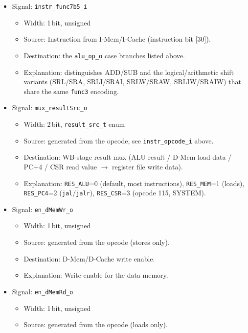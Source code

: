 \begin{itemize}
\begin{itemize}
      \texttt{BR\_GE} (\texttt{bge}); 110 $\to$ \texttt{BR\_LTU}
      (\texttt{bltu}); 111 $\to$ \texttt{BR\_GEU} (\texttt{bgeu}); 010/011
      $\to$ \texttt{trap\_illegal\_instr\_o}=1 (reserved encodings).
  \end{itemize}
  \item Signal: \texttt{instr\_func7b5\_i}
  \begin{itemize}
    \item Width: 1\,bit, unsigned
    \item Source: Instruction from I-Mem/I-Cache (instruction bit [30]).
    \item Destination: the \texttt{alu\_op\_o} case branches listed above.
    \item Explanation: distinguishes ADD/SUB and the logical/arithmetic
      shift variants (SRL/SRA, SRLI/SRAI, SRLW/SRAW, SRLIW/SRAIW) that
      share the same \texttt{func3} encoding.
  \end{itemize}
  \item Signal: \texttt{mux\_resultSrc\_o}
  \begin{itemize}
    \item Width: 2\,bit, \texttt{result\_src\_t} enum
    \item Source: generated from the opcode, see \texttt{instr\_opcode\_i} above.
    \item Destination: WB-stage result mux (ALU result / D-Mem load data /
      PC+4 / CSR read value $\to$ register file write data).
    \item Explanation: \texttt{RES\_ALU}=0 (default, most instructions),
      \texttt{RES\_MEM}=1 (loads), \texttt{RES\_PC4}=2 (\texttt{jal}/\texttt{jalr}),
      \texttt{RES\_CSR}=3 (opcode 115, SYSTEM).
  \end{itemize}
  \item Signal: \texttt{en\_dMemWr\_o}
  \begin{itemize}
    \item Width: 1\,bit, unsigned
    \item Source: generated from the opcode (stores only).
    \item Destination: D-Mem/D-Cache write enable.
    \item Explanation: Write-enable for the data memory.
  \end{itemize}
  \item Signal: \texttt{en\_dMemRd\_o}
  \begin{itemize}
    \item Width: 1\,bit, unsigned
    \item Source: generated from the opcode (loads only).

\end{itemize}
\end{itemize}
